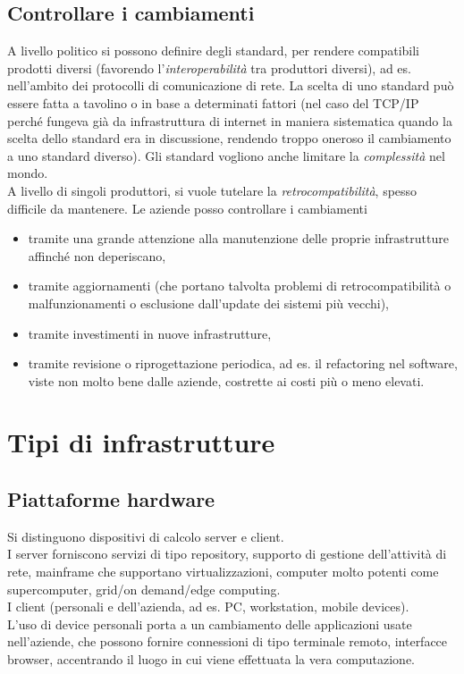 \subsection{Controllare i cambiamenti}
A livello politico si possono definire degli standard, per rendere compatibili prodotti diversi (favorendo l'\textit{interoperabilit\`a} tra produttori diversi), ad es. nell'ambito dei protocolli di comunicazione di rete. La scelta di uno standard pu\`o essere fatta a tavolino o in base a determinati fattori (nel caso del TCP/IP perch\'e fungeva gi\`a da infrastruttura di internet in maniera sistematica quando la scelta dello standard era in discussione, rendendo troppo oneroso il cambiamento a uno standard diverso).
Gli standard vogliono anche limitare la \textit{complessit\`a} nel mondo. \\
A livello di singoli produttori, si vuole tutelare la \textit{retrocompatibilit\`a}, spesso difficile da mantenere.
Le aziende posso controllare i cambiamenti
\begin{itemize}
\item tramite una grande attenzione alla manutenzione delle proprie infrastrutture affinch\'e non deperiscano, 
\item tramite aggiornamenti (che portano talvolta problemi di retrocompatibilit\`a o malfunzionamenti o esclusione dall'update dei sistemi pi\`u vecchi), 
\item tramite investimenti in nuove infrastrutture, 
\item tramite revisione o riprogettazione periodica, ad es. il refactoring nel software, viste non molto bene dalle aziende, costrette ai costi pi\`u o meno elevati.
\end{itemize}

\section{Tipi di infrastrutture}
\subsection{Piattaforme hardware}
Si distinguono dispositivi di calcolo server e client.\\
I server forniscono servizi di tipo repository, supporto di gestione dell'attivit\`a di rete, mainframe che supportano virtualizzazioni, computer molto potenti come supercomputer, grid/on demand/edge computing.\\
I client (personali e dell'azienda, ad es. PC, workstation, mobile devices).\\
L'uso di device personali porta a un cambiamento delle applicazioni usate nell'aziende, che possono fornire connessioni di tipo terminale remoto, interfacce browser, accentrando il luogo in cui viene effettuata la vera computazione.
